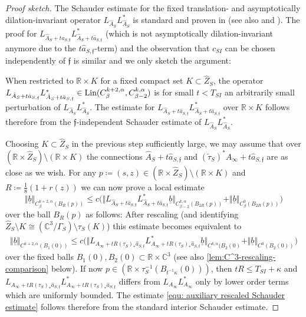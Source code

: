 \documentclass[11pt,a4paper]{scrartcl}
\newcommand{\VertC}[2]{\Vert_{C^{{#1}}{#2}}}
\newcommand{\VertWC}[3]{\Vert_{C^{{#1}}_{{#2}}{#3}}}
\newcommand{\VertH}[2]{\Vert_{C^{{#1},\alpha}{#2}}}
\newcommand{\VertWH}[3]{\Vert_{C^{{#1},\alpha}_{{#2}}{#3}}}
\numberwithin{equation}{section}
\theoremstyle{plain}
\theoremstyle{definition}
\theoremstyle{remark}
\begin{document}
\begin{proof}[Proof sketch]
The Schauder estimate for the fixed translation- and asymptotically dilation-invariant operator $L_{\hat{A}_S}L_{\hat{A}_S}^*$ is standard and proven in \cite[Proposition~7.11]{Walpuski-InstantonsKummer} (see also \cite[Theorem~3.1]{NirenbergWalker-Null_space_of_elliptic_operator} and \cite[Proposition~1.6]{Bartnik-MassofALF}). The proof for $L_{\hat{A}_S+t \hat{a}_{S,\mathfrak{f}}} L_{\hat{A}_S+t \hat{a}_{S,\mathfrak{f}}}^*$ (which is not asymptotically dilation-invariant anymore due to the $t \hat{a}_{S,\mathfrak{f}}$-term) and the observation that $c_{SI}$ can be chosen independently of $\mathfrak{f}$ is similar and we only sketch the argument:

When restricted to $\mathbb{R}\times K$ for a fixed compact set $K\subset \hat{Z}_S$, the operator $L_{\hat{A}_S+t \hat{a}_{S,\mathfrak{f}}} L_{\hat{A}_S+t \hat{a}_{S,\mathfrak{f}}}^*\in \textup{Lin}(C^{k+2,\alpha}_\beta,C^{k,\alpha}_{\beta-2})$ is for small $t< T_{SI}$ an arbitrarily small perturbation of $L_{\hat{A}_S} L_{\hat{A}_S}^*$. The estimate for $L_{\hat{A}_S+t \hat{a}_{S,\mathfrak{f}}} L_{\hat{A}_S+t \hat{a}_{S,\mathfrak{f}}}^*$ over $\mathbb{R}\times K$ follows therefore from the $\mathfrak{f}$-independent Schauder estimate of $L_{\hat{A}_S}L^*_{\hat{A}_S}$.

Choosing $K \subset \hat{Z}_S$ in the previous step sufficiently large, we may assume that over $(\mathbb{R}\times \hat{Z}_S)\setminus (\mathbb{R}\times K)$ the connections $\hat{A}_S + t\hat{a}_{S,\mathfrak{f}}$ and $(\tilde{\tau}_S)^*A_\infty + t \hat{a}_{S,\mathfrak{f}}$ are as close as we wish. For any $p\coloneqq (s,z) \in (\mathbb{R}\times \hat{Z}_S)\setminus (\mathbb{R}\times K)$ and $R\coloneqq \tfrac{1}{8}(1+r(z))$ we can now prove a local estimate \[ \Vert \underline{b} \VertWH{k+2}{\beta}{(B_R(p))} \leq c \big(\Vert L_{\hat{A}_S+t \hat{a}_{S,\mathfrak{f}}} L_{\hat{A}_S+t \hat{a}_{S,\mathfrak{f}}}^* \underline{b} \VertWH{k}{\beta-2}{(B_{2R}(p))} + \Vert \underline{b} \VertWC{0}{\beta}{(B_{2R}(p))} \big) \] over the ball $B_R(p)$ as follows: After rescaling (and identifying $\hat{Z}_S\setminus K \cong (\mathbb{C}^3/\Gamma_S) \setminus \tau_S(K)$) this estimate becomes equivalent to  
\begin{align}\label{equ: auxiliary rescaled Schauder estimate}
\Vert \underline{b} \VertH{k+2}{(B_1(0))} \leq c \big( \Vert  L_{A_\infty +tR(\tau_S)_* \hat{a}_{S,\mathfrak{f}}}L_{A_\infty +tR(\tau_S)_* \hat{a}_{S,\mathfrak{f}}}^* \underline{b} \VertH{k}{(B_2(0)} + \Vert \underline{b} \VertC{0}{(B_2(0))} \big)
\end{align}
over the fixed balls $B_1(0),B_2(0) \subset \mathbb{R}\times \mathbb{C}^3$ (see also \autoref{lem:C^3-rescaling-comparison} below). If now $p \in (\mathbb{R}\times \tau_S^{-1}(B_{t^{-1}\kappa}(0)))$, then $tR\leq T_{SI}+\kappa$ and $L_{A_\infty +tR(\tau_S)_* \hat{a}_{S,\mathfrak{f}}}L_{A_\infty +tR(\tau_S)_* \hat{a}_{S,\mathfrak{f}}}^*$ differs from $L_{A_\infty}L_{A_\infty}^*$ only by lower order terms which are uniformly bounded. The estimate \eqref{equ: auxiliary rescaled Schauder estimate} follows therefore from the standard interior Schauder estimate.


\end{proof}
\end{document}
